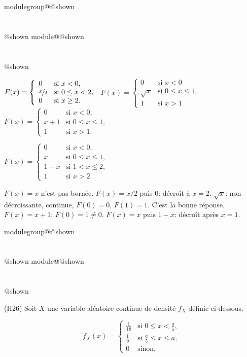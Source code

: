 \documentclass{Evaluation}
\makeatletter
\newcommand{\currentmodulekey}{}
\newcommand{\currentmoduletitle}{}
\newcommand{\currentgroupkey}{}
\newcommand{\currentgrouptitle}{}
\newcommand{\showmoduleifneeded}{%
  \ifx\currentgroupkey\empty\else
    \expandafter\ifx\csname modulegroup@\currentgroupkey @shown\endcsname\relax
      \section*{\currentgrouptitle}%
      \expandafter\gdef\csname modulegroup@\currentgroupkey @shown\endcsname{1}%
    \fi
  \fi
  \expandafter\ifx\csname module@\currentmodulekey @shown\endcsname\relax
    \section*{\currentmoduletitle}%
    \expandafter\gdef\csname module@\currentmodulekey @shown\endcsname{1}%
  \fi
}
\newenvironment{A24}{\showmoduleifneeded}{}
\newenvironment{H26}{\showmoduleifneeded}{}
\makeatother
\begin{document}
\begin{questions}
\begin{A24}
\begin{checkboxes}
\choice $ F(x) = \left\{
			\begin{array}{ll}
			0  & \mbox{si } x<0, \\
			\displaystyle \sfrac{x}{2} & \mbox{si } 0\leq x < 2,\\
			0 & \mbox{si } x \geq 2.
			\end{array}
			\right. $
\correctchoice $ F(x) = \left\{
			\begin{array}{ll}
            0 & \mbox{si } x<0\\
			\sqrt{x}  & \mbox{si } 0\leq x\leq 1, \\
			1 & \mbox{si } x>1
			\end{array}
			\right. $
\choice $ F(x) = \left\{
			\begin{array}{ll}
			0  & \mbox{si } x < 0, \\
			x + 1& \mbox{si } 0 \leq x \leq 1,\\
			1 &  \mbox{si } x > 1.
			\end{array}
			\right. $

   \choice $ F(x) = \left\{
			\begin{array}{ll}
			0  & \mbox{si } x < 0, \\
			x & \mbox{si } 0 \leq x \leq 1,\\
                1-x & \mbox{si } 1< x \leq 2,\\
			1 &  \mbox{si } x> 2.
			\end{array}
			\right. $
\end{checkboxes}

\begin{solution}
    $F(x)=x$ n'est pas bornée. $F(x)=x/2$ puis $0$: décroît à $x=2$. $\sqrt{x}$: non décroissante, continue, $F(0)=0$, $F(1)=1$. C'est la bonne réponse. $F(x)=x+1$: $F(0)=1\neq 0$. $F(x)=x$ puis $1-x$: décroît après $x=1$.
\end{solution}
\end{A24}

\begin{H26}
\question {}\label{densite} (H26) Soit $X$ une variable aléatoire continue de densité $f_X$ définie ci-dessous.

\begin{minipage}[]{7cm}{
\vspace{0cm}
\[ f_X(x) = \begin{cases}
\displaystyle \frac{1}{18} & \mbox{si } 0\leq x < \displaystyle \frac{a}{5}, \\
\displaystyle \frac{1}{9} & \mbox{si } \displaystyle\frac{a}{5}\leq x \leq \displaystyle a, \\
\displaystyle 0 & \mbox{sinon.}
\end{cases} \]
    }
\end{minipage}
 \hspace{10mm}
\begin{minipage}[]{7cm}{
\vspace{0cm}
\begin{tikzpicture}[xscale=0.6, yscale=25]


\end{tikzpicture}}
\end{minipage}
\end{H26}
\end{questions}
\end{document}

